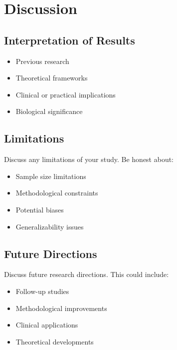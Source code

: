 
\section{Discussion}

\subsection{Interpretation of Results}

\begin{itemize}
\item Previous research
\item Theoretical frameworks
\item Clinical or practical implications
\item Biological significance
\end{itemize}

\subsection{Limitations}

Discuss any limitations of your study. Be honest about:
\begin{itemize}
\item Sample size limitations
\item Methodological constraints
\item Potential biases
\item Generalizability issues
\end{itemize}

\subsection{Future Directions}

Discuss future research directions. This could include:
\begin{itemize}
\item Follow-up studies
\item Methodological improvements
\item Clinical applications
\item Theoretical developments
\end{itemize}

